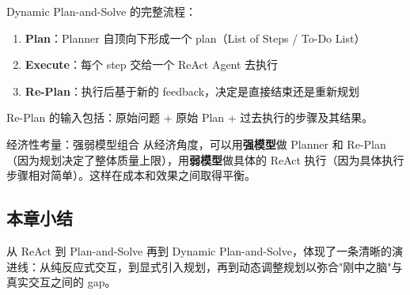 Dynamic Plan-and-Solve 的完整流程：
\begin{enumerate}
    \item \textbf{Plan}：Planner 自顶向下形成一个 plan（List of Steps / To-Do List）
    \item \textbf{Execute}：每个 step 交给一个 ReAct Agent 去执行
    \item \textbf{Re-Plan}：执行后基于新的 feedback，决定是直接结束还是重新规划
\end{enumerate}

Re-Plan 的输入包括：原始问题 + 原始 Plan + 过去执行的步骤及其结果。

\begin{knowledgebox}{经济性考量：强弱模型组合}
从经济角度，可以用\textbf{强模型}做 Planner 和 Re-Plan（因为规划决定了整体质量上限），用\textbf{弱模型}做具体的 ReAct 执行（因为具体执行步骤相对简单）。这样在成本和效果之间取得平衡。
\end{knowledgebox}

\subsection{本章小结}

从 ReAct 到 Plan-and-Solve 再到 Dynamic Plan-and-Solve，体现了一条清晰的演进线：从纯反应式交互，到显式引入规划，再到动态调整规划以弥合"刚中之脑"与真实交互之间的 gap。


